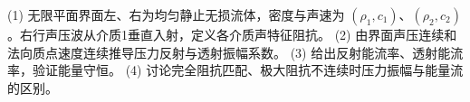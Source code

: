 (1) 无限平面界面左、右为均匀静止无损流体，密度与声速为 \((\rho_1,c_1)\)、\((\rho_2,c_2)\)。右行声压波从介质1垂直入射，定义各介质声特征阻抗。
(2) 由界面声压连续和法向质点速度连续推导压力反射与透射振幅系数。
(3) 给出反射能流率、透射能流率，验证能量守恒。
(4) 讨论完全阻抗匹配、极大阻抗不连续时压力振幅与能量流的区别。
